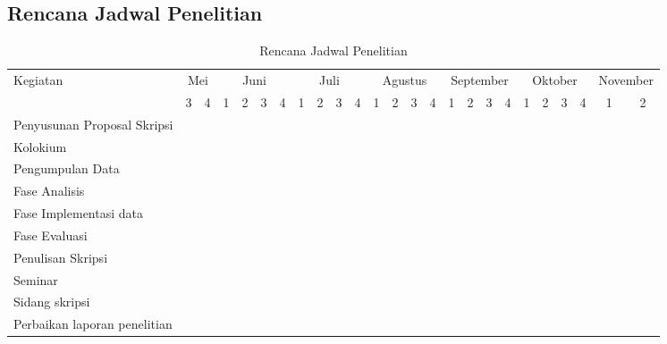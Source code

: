 \subsection*{Rencana Jadwal Penelitian}

\begin{table}[h!]
	\begin{center}
		\caption{Rencana Jadwal Penelitian}
		\label{tab:jadwal}
		\footnotesize
		\begin{tabular}{|l|c|c|c|c|c|c|c|c|c|c|c|c|c|c|c|c|c|c|c|c|c|c|c|c|}
			\hline
			\multirow{2}{*}{Kegiatan}&\multicolumn{2}{c|}{Mei}&\multicolumn{4}{c|}{Juni}&\multicolumn{4}{c|}{Juli}&\multicolumn{4}{c|}{Agustus}&\multicolumn{4}{c|}{September}&\multicolumn{4}{c|}{Oktober}&\multicolumn{2}{c|}{November}\\
			\cline{2-25}
			&3&4&1&2&3&4&1&2&3&4&1&2&3&4&1&2&3&4&1&2&3&4&1&2\\
			\hline
			Penyusunan Proposal Skripsi&\cellcolor{black}&\cellcolor{black}&\cellcolor{black}&\cellcolor{black}&\cellcolor{black}&&&&&&&&&&&&&&&&&&&\\
			\hline
			Kolokium&&&&&&\cellcolor{black}&&&&&&&&&&&&&&&&&&\\
			\hline
			Pengumpulan Data&\cellcolor{black}&\cellcolor{black}&\cellcolor{black}&\cellcolor{black}&\cellcolor{black}&\cellcolor{black}&&&&&&&&&&&&&&&&&&\\
			\hline
			Fase Analisis&&&&&&&\cellcolor{black}&\cellcolor{black}&&&&&&&&&&&&&&&&\\
			\hline
			Fase Implementasi data&&&&&&&&&\cellcolor{black}&\cellcolor{black}&\cellcolor{black}&\cellcolor{black}&\cellcolor{black}&\cellcolor{black}&\cellcolor{black}&\cellcolor{black}&&&&&&&&\\
			\hline
			Fase Evaluasi&&&&&&&&&&&&&&&&&\cellcolor{black}&\cellcolor{black}&&&&&&\\
			\hline
			Penulisan Skripsi&&&&&&&&&\cellcolor{black}&\cellcolor{black}&\cellcolor{black}&\cellcolor{black}&\cellcolor{black}&\cellcolor{black}&\cellcolor{black}&\cellcolor{black}&\cellcolor{black}&\cellcolor{black}&\cellcolor{black}&&&&&\\
			\hline
			Seminar&&&&&&&&&&&&&&&&&&&&\cellcolor{black}&&&&\\
			\hline
			Sidang skripsi&&&&&&&&&&&&&&&&&&&&&&\cellcolor{black}&&\\
			\hline
			Perbaikan laporan penelitian&&&&&&&&&&&&&&&&&&&&&&&\cellcolor{black}&\cellcolor{black}\\
			\hline
		\end{tabular}
		\normalsize
	\end{center}
\end{table}